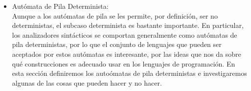 \documentclass[12pt,a4paper,spanish]{book}
\begin{document}
\begin{itemize}
El significado de las transiciones puede ser explicado analizando la primera transici\'on:

$\delta$($q_{0}$, a, $\epsilon$) = \{($q_{1}$, $\underline{A}$)\}

donde q0 es el estado actual, a es el s\'imbolo en la entrada y $\epsilon$ se extrae de la cima de la pila. Entonces, el estado del aut\'omata cambia a q1 y el s\'imbolo $\underline{A}$ se coloca en la cima de la pila.

La idea del funcionamiento del aut\'omata es que al ir leyendo los diferentes s\'imbolos del alfabeto de entrada $\Sigma$, estos pasan a la pila en forma de s\'imbolos del alfabeto de pila. Al aparecer el primer s\'imbolo b en la entrada, se comienza el proceso de desapilado, de forma que coincida el n\'umero de s\'imbolos b le\'idos con el n\'umero de s\'imbolos A que aparecen en la pila.\\
\item Aut\'omata de Pila Determinista:\\
\newline
Aunque a los aut\'omatas de pila se les permite, por definici\'on, ser no deterministas,
el subcaso determinista es bastante importante. En particular, los analizadores
sint\'acticos se comportan generalmente como aut\'omatas de pila deterministas, por
lo que el conjunto de lenguajes que pueden ser aceptados por estos aut\'omatas es
interesante, por las ideas que nos da sobre qu\'e construcciones es adecuado usar en
los lenguajes de programaci\'on. En esta secci\'on definiremos los auto\'omatas de pila
deterministas e investigaremos algunas de las cosas que pueden hacer y no hacer.\\


\end{itemize}
\end{document}
